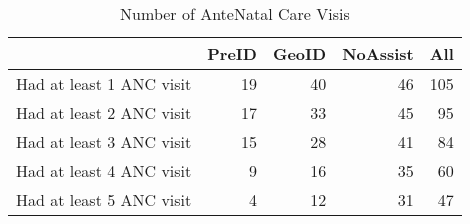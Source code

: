\begin{table}[ht]
\centering
\begin{tabular}{rrrrr}
  \hline
 & PreID & GeoID & NoAssist & All \\ 
  \hline
Had at least 1 ANC visit &  19 &  40 &  46 & 105 \\ 
  Had at least 2 ANC visit &  17 &  33 &  45 &  95 \\ 
  Had at least 3 ANC visit &  15 &  28 &  41 &  84 \\ 
  Had at least 4 ANC visit &   9 &  16 &  35 &  60 \\ 
  Had at least 5 ANC visit &   4 &  12 &  31 &  47 \\ 
   \hline
\end{tabular}
\caption{Number of AnteNatal Care Visis} 
\end{table}
